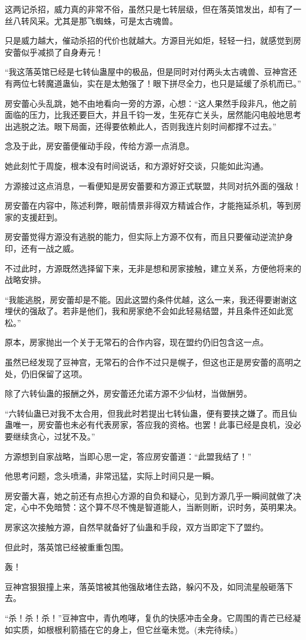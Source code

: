 \begin{this_body}
这两记杀招，威力真的非常不俗，虽然只是七转层级，但在落英馆发出，却有了一丝八转风采。尤其是那飞蜘蛛，可是太古魂兽。

只是威力越大，催动杀招的代价也就越大。方源目光如炬，轻轻一扫，就感觉到房安蕾似乎减损了自身寿元！

“我这落英馆已经是七转仙蛊屋中的极品，但是同时对付两头太古魂兽、豆神宫还有两位七转魔道蛊仙，实在是太勉强了！眼下拼尽全力，也只是延缓了杀机而已。”

房安蕾心头乱跳，她不由地看向一旁的方源，心想：“这人果然手段非凡，他之前面临的压力，比我还要巨大，并且千钧一发，生死存亡关头，居然能闪电般地思考出逃脱之法。眼下局面，还得要依赖此人，否则我连片刻时间都撑不过去。”

念及于此，房安蕾便催动手段，传给方源一点消息。

她此刻忙于周旋，根本没有时间说话，和方源好好交谈，只能如此沟通。

方源接过这点消息，一看便知是房安蕾要和方源正式联盟，共同对抗外面的强敌！

房安蕾在内容中，陈述利弊，眼前情景非得双方精诚合作，才能拖延杀机，等到房家的支援赶到。

房安蕾觉得方源没有逃脱的能力，但实际上方源不仅有，而且只要催动逆流护身印，还有一战之威。

不过此时，方源既然选择留下来，无非是想和房家接触，建立关系，方便他将来的战略安排。

“我能逃脱，房安蕾却是不能。因此这盟约条件优越，这么一来，我还得要谢谢这埋伏的强敌了。若非是他们，我和房家绝不会如此轻易结盟，并且条件还如此宽松。”

原本，房家抛出一个关于无常石的合作内容，现在盟约仍旧包含这一点。

虽然已经发现了豆神宫，无常石的合作不过只是幌子，但这也正是房安蕾的高明之处，仍旧保留了这项。

除了六转仙蛊的报酬之外，房安蕾还允诺方源不少仙材，当做酬劳。

“六转仙蛊已对我不太合用，但我此时若提出七转仙蛊，便有要挟之嫌了。而且仙蛊唯一，房安蕾也未必有代表房家，答应我的资格。也罢！此事已经是良机，没必要继续贪心，过犹不及。”

方源想到自家战略，当即心思一定，答应房安蕾道：“此盟我结了！”

他思考问题，念头喷涌，非常迅猛，实际上时间只是一瞬。

房安蕾大喜，她之前还有点担心方源的自负和疑心，见到方源几乎一瞬间就做了决定，心中不免暗赞：这个算不尽不愧是智道能人，当断则断，识时务，英明果决。

房家这次接触方源，自然早就备好了仙蛊和手段，双方当即定下了盟约。

但此时，落英馆已经被重重包围。

轰！

豆神宫狠狠撞上来，落英馆被其他强敌堵住去路，躲闪不及，如同流星般砸落下去。

“杀！杀！杀！”豆神宫中，青仇咆哮，复仇的快感冲击全身。它周围的青芒已经凝如实质，如根根利箭插在它的身上，但它丝毫未觉。(未完待续。)

\end{this_body}

